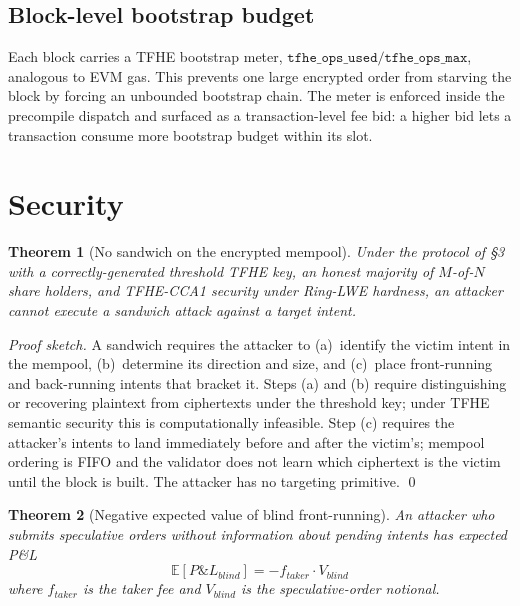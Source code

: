 \documentclass[11pt,a4paper]{article}
\newtheorem{theorem}{Theorem}
\begin{document}
\subsection{Block-level bootstrap budget}

Each block carries a TFHE bootstrap meter,
$\texttt{tfhe\_ops\_used} / \texttt{tfhe\_ops\_max}$, analogous to
EVM gas. This prevents one large encrypted order from starving the
block by forcing an unbounded bootstrap chain. The meter is enforced
inside the precompile dispatch and surfaced as a transaction-level
fee bid: a higher bid lets a transaction consume more bootstrap
budget within its slot.

\section{Security}

\begin{theorem}[No sandwich on the encrypted mempool]
\label{thm:sandwich}
Under the protocol of \S3 with a correctly-generated threshold
TFHE key, an honest majority of $M$-of-$N$ share holders, and
TFHE-CCA1 security under Ring-LWE hardness, an attacker cannot
execute a sandwich attack against a target intent.
\end{theorem}

\begin{proof}[Proof sketch]
A sandwich requires the attacker to (a)~identify the victim intent
in the mempool, (b)~determine its direction and size, and (c)~place
front-running and back-running intents that bracket it. Steps (a)
and (b) require distinguishing or recovering plaintext from
ciphertexts under the threshold key; under TFHE semantic security
this is computationally infeasible. Step (c) requires the
attacker's intents to land immediately before and after the
victim's; mempool ordering is FIFO and the validator does not
learn which ciphertext is the victim until the block is built. The
attacker has no targeting primitive. \qed
\end{proof}

\begin{theorem}[Negative expected value of blind front-running]
\label{thm:blind-frontrun}
An attacker who submits speculative orders without information
about pending intents has expected P\&L
\[
\mathbb{E}[\textit{P\&L}_{\textit{blind}}] = -f_{\textit{taker}}
\cdot V_{\textit{blind}}
\]
where $f_{\textit{taker}}$ is the taker fee and
$V_{\textit{blind}}$ is the speculative-order notional.
\end{theorem}
\end{document}

